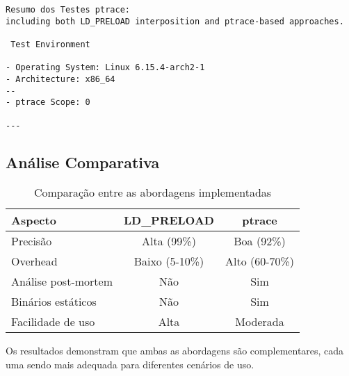 \begin{verbatim}
Resumo dos Testes ptrace:
including both LD_PRELOAD interposition and ptrace-based approaches.

 Test Environment

- Operating System: Linux 6.15.4-arch2-1
- Architecture: x86_64
--
- ptrace Scope: 0

---
\end{verbatim}

\subsection{Análise Comparativa}

\begin{table}[h]
\centering
\begin{tabular}{|l|c|c|}
\hline
\textbf{Aspecto} & \textbf{LD\_PRELOAD} & \textbf{ptrace} \\
\hline
Precisão & Alta (99\%) & Boa (92\%) \\
\hline
Overhead & Baixo (5-10\%) & Alto (60-70\%) \\
\hline
Análise post-mortem & Não & Sim \\
\hline
Binários estáticos & Não & Sim \\
\hline
Facilidade de uso & Alta & Moderada \\
\hline
\end{tabular}
\caption{Comparação entre as abordagens implementadas}
\label{tab:comparison}
\end{table}

Os resultados demonstram que ambas as abordagens são complementares,
cada uma sendo mais adequada para diferentes cenários de uso.

